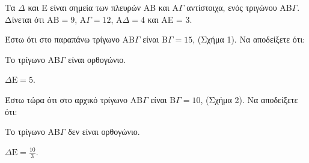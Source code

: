 Τα $\Delta$ και E είναι σημεία των πλευρών AB και A$\Gamma$ αντίστοιχα, ενός τριγώνου AB$\Gamma$. Δίνεται ότι $\text{AB} = 9$, A$\Gamma = 12$, A$\Delta = 4$ και AE = 3.
\begin{alist}
    \item Έστω ότι στο παραπάνω τρίγωνο AB$\Gamma$ είναι B$\Gamma = 15$, (Σχήμα 1). Να αποδείξετε ότι:
    \begin{rlist}
        \item Το τρίγωνο AB$\Gamma$ είναι ορθογώνιο. 
        \item $\Delta \text{E} = 5$. 
    \end{rlist}
    \item Έστω τώρα ότι στο αρχικό τρίγωνο AB$\Gamma$ είναι B$\Gamma = 10$, (Σχήμα 2). Να αποδείξετε ότι:
    \begin{rlist}
        \item Το τρίγωνο AB$\Gamma$ δεν είναι ορθογώνιο. 
        \item $\Delta \text{E} = \frac{10}{3}$. 
    \end{rlist}
\end{alist}